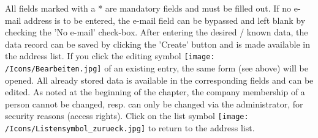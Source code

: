 \vspace{\baselineskip}
All fields marked with a * are mandatory fields and must be filled out. If no e-mail address is to be entered, the e-mail field can be bypassed and left blank by checking the 'No e-mail' check-box. After entering the desired / known data, the data record can be saved by clicking the 'Create' button  and is made available in the address list. If you click the editing symbol \texttt{[image: /Icons/Bearbeiten.jpg]} of an existing entry, the same form (see above) will be opened. All already stored data is available in the corresponding fields and can be edited. As noted at the beginning of the chapter, the company membership of a person cannot be changed, resp. can only be changed via the administrator, for security reasons (access rights).\newline
Click on the list symbol \texttt{[image: /Icons/Listensymbol\_zurueck.jpg]}  to return to the address list.
